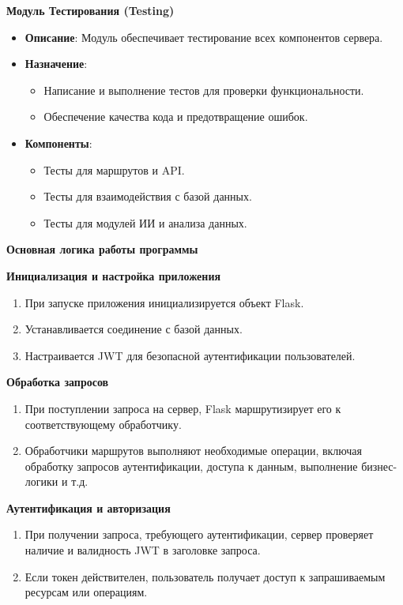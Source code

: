 \documentclass[12pt, russian]{extarticle}
\begin{document}
\begin{spacing}{1.5}
\par \noindent \textbf{Модуль Тестирования (Testing)}
\begin{itemize}
    \item \textbf{Описание}: Модуль обеспечивает тестирование всех компонентов сервера.
    \item \textbf{Назначение}:
    \begin{itemize}
        \item Написание и выполнение тестов для проверки функциональности.
        \item Обеспечение качества кода и предотвращение ошибок.
    \end{itemize}
    \item \textbf{Компоненты}:
    \begin{itemize}
        \item Тесты для маршрутов и API.
        \item Тесты для взаимодействия с базой данных.
        \item Тесты для модулей ИИ и анализа данных.
    \end{itemize}
\end{itemize}

\par \noindent \textbf{Основная логика работы программы}

\par \noindent \textbf{Инициализация и настройка приложения}
\begin{enumerate}
    \item При запуске приложения инициализируется объект Flask.
    \item Устанавливается соединение с базой данных.
    \item Настраивается JWT для безопасной аутентификации пользователей.
\end{enumerate}

\par \noindent \textbf{Обработка запросов}
\begin{enumerate}
    \item При поступлении запроса на сервер, Flask маршрутизирует его к соответствующему обработчику.
    \item Обработчики маршрутов выполняют необходимые операции, включая обработку запросов аутентификации, доступа к данным, выполнение бизнес-логики и т.д.
\end{enumerate}

\par \noindent \textbf{Аутентификация и авторизация}
\begin{enumerate}
    \item При получении запроса, требующего аутентификации, сервер проверяет наличие и валидность JWT в заголовке запроса.
    \item Если токен действителен, пользователь получает доступ к запрашиваемым ресурсам или операциям.
\end{enumerate}


\end{spacing}
\end{document}
